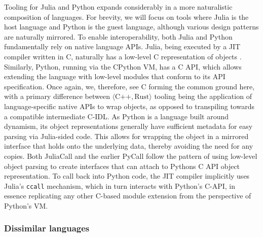Tooling for Julia and Python expands considerably in a more naturalistic composition of languages. For brevity, we will focus on tools where Julia is the host language and Python is the guest language, although various design patterns are naturally mirrored. To enable interoperability, both Julia and Python fundamentally rely on native language APIs. Julia, being executed by a JIT compiler written in C, naturally has a low-level C representation of objects \cite{julia_object_model}. Similarly, Python, running via the CPython VM, has a C API, which allows extending the language with low-level modules that conform to its API specification. Once again, we, therefore, see C forming the common ground here, with a primary difference between $\langle \text{C++}, \text{Rust}\rangle$ tooling being the application of language-specific native APIs to wrap objects, as opposed to transpiling towards a compatible intermediate C-IDL. As Python is a language built around dynamism, its object representations generally have sufficient metadata for easy parsing via Julia-sided code. This allows for wrapping the object in a mirrored interface that holds onto the underlying data, thereby avoiding the need for any copies. Both JuliaCall \cite{juliacall} and the earlier PyCall \cite{Johnson2024JuliaPy} follow the pattern of using low-level object parsing to create interfaces that can attach to Pythons C API object representation. To call back into Python code, the JIT compiler implicitly uses Julia's \texttt{ccall} mechanism, which in turn interacts with Python's C-API, in essence replicating any other C-based module extension from the perspective of Python's VM. 

\subsubsection{Dissimilar languages}\label{s:dissimilar_langs}

